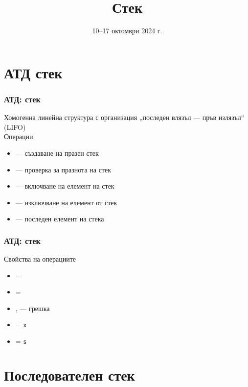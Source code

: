 \documentclass[alsotrans, beameroptions={aspectratio=169}]{beamerswitch}
\title{Стек}
\date{10--17 октомври 2024 г.}
\begin{document}
\begin{frame}
  \titlepage
\end{frame}

\section{АТД стек}

\begin{frame}
  \frametitle{АТД: стек}

  Хомогенна линейна структура с организация „последен влязъл --- пръв излязъл“ (LIFO)\\[2ex]
  Операции\\[1ex]
  \begin{itemize}
  \item {} --- създаване на празен стек
  \item {} --- проверка за празнота на стек
  \item {} --- включване на елемент на стек
  \item {} --- изключване на елемент от стек
  \item {} --- последен елемент на стека
  \end{itemize}
\end{frame}

\begin{frame}
  \frametitle{АТД: стек}

  Свойства на операциите\\[1ex]
  \begin{itemize}
  \item {} = 
  \item {} = 
  \item {},  --- \alert{грешка}
  \item {} = \tt x
  \item {} = \tt s
  \end{itemize}
\end{frame}

\section{Последователен стек}
\end{document}
